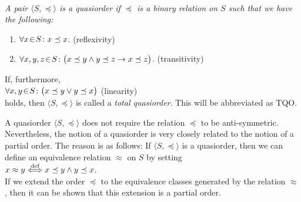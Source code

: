 \begin{Definition}[Quasiorder]  \hspace*{\fill} \\
{\em
  A pair $\langle S, \preceq\rangle$ is a \emph{quasiorder}  if $\preceq$ is a 
  binary relation on $S$ such that we have the following:
  \begin{enumerate}
  \item $\forall x \!\in\! S\colon x \preceq x$. \hspace*{\fill} (reflexivity)
  \item $\forall x, y, z \!\in\! S \colon \bigl(x \preceq y \wedge y \preceq z \rightarrow x \preceq z\bigr)$. 
         \hspace*{\fill} (transitivity)
  \end{enumerate}
  If, furthermore,
  \\[0.2cm]
  \hspace*{1.3cm}
  $\forall x, y \!\in\! S \colon \bigl(x \preceq y \vee y \preceq x\bigr)$ \hspace*{\fill} (linearity)
  \\[0.2cm]
  holds, then $\langle S, \preceq \rangle$ is called a \emph{total quasiorder}.  This will be
  abbreviated as \textsc{TQO}.
}
\end{Definition}
A quasiorder $\langle S, \preceq \rangle$ does not require the relation $\preceq$ to be
anti-symmetric.  Nevertheless, the notion of a quasiorder is very closely related to the notion of a
partial order.  The reason is as follows:  If $\langle S, \preceq \rangle$ is a quasiorder, then we
can define an equivalence relation $\approx$ on $S$ by setting
\\[0.2cm]
\hspace*{1.3cm}
$x \approx y \stackrel{\mbox{\scriptsize def}}{\Longleftrightarrow} x \preceq y \wedge y \preceq x$. 
\\[0.2cm]
If we extend the order $\preceq$ to the equivalence classes generated by the relation $\approx$,
then it can be shown that this extension is a partial order.
\vspace*{0.3cm}

